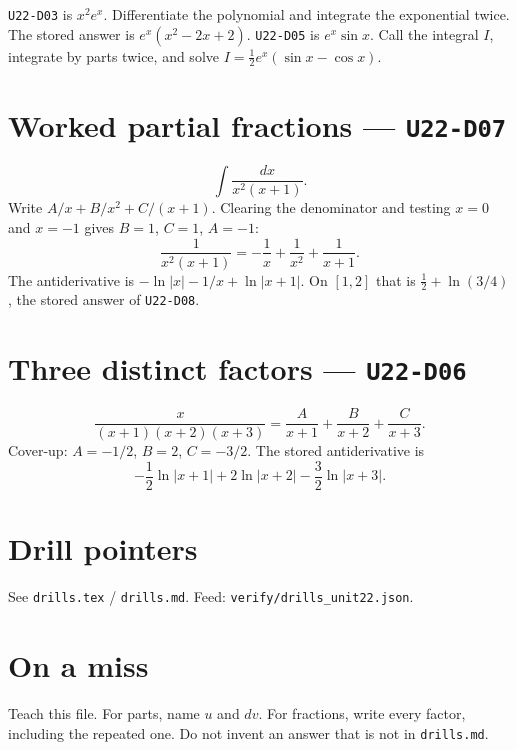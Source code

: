 \texttt{U22-D03} is $x^2 e^x$. Differentiate the polynomial and integrate the exponential twice. The stored answer is $e^x(x^2-2x+2)$. \texttt{U22-D05} is $e^x\sin x$. Call the integral $I$, integrate by parts twice, and solve $I=\frac12 e^x(\sin x-\cos x)$.

\section{Worked partial fractions --- \texttt{U22-D07}}
\[
\int\frac{dx}{x^2(x+1)}.
\]
Write $A/x+B/x^2+C/(x+1)$. Clearing the denominator and testing $x=0$ and $x=-1$ gives $B=1$, $C=1$, $A=-1$:
\[
\frac{1}{x^2(x+1)}=-\frac{1}{x}+\frac{1}{x^2}+\frac{1}{x+1}.
\]
The antiderivative is $-\ln|x|-1/x+\ln|x+1|$. On $[1,2]$ that is $\frac12+\ln(3/4)$, the stored answer of \texttt{U22-D08}.

\section{Three distinct factors --- \texttt{U22-D06}}
\[
\frac{x}{(x+1)(x+2)(x+3)}=\frac{A}{x+1}+\frac{B}{x+2}+\frac{C}{x+3}.
\]
Cover-up: $A=-1/2$, $B=2$, $C=-3/2$. The stored antiderivative is
\[
-\frac12\ln|x+1|+2\ln|x+2|-\frac32\ln|x+3|.
\]

\section{Drill pointers}
See \texttt{drills.tex} / \texttt{drills.md}. Feed: \texttt{verify/drills\_unit22.json}.

\section*{On a miss}
Teach this file. For parts, name $u$ and $dv$. For fractions, write every factor, including the repeated one. Do not invent an answer that is not in \texttt{drills.md}.

